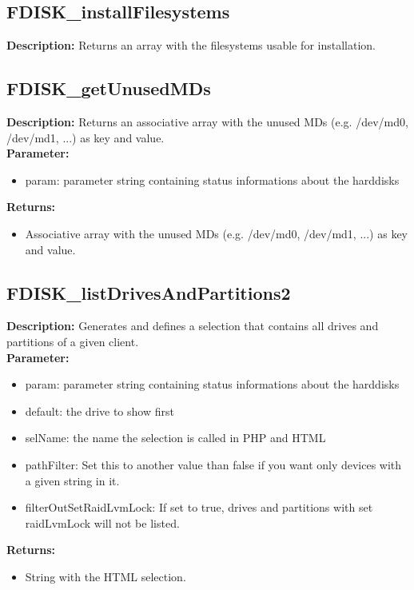 \subsection{FDISK\_installFilesystems}
\textbf{Description:} Returns an array with the filesystems usable for installation.\\

\subsection{FDISK\_getUnusedMDs}
\textbf{Description:} Returns an associative array with the unused MDs (e.g. /dev/md0, /dev/md1, ...) as key and value.\\
\textbf{Parameter:}
\begin{itemize}
\item param: parameter string containing status informations about the harddisks
\end{itemize}
\textbf{Returns:}
\begin{itemize}
\item Associative array with the unused MDs (e.g. /dev/md0, /dev/md1, ...) as key and value.
\end{itemize}

\subsection{FDISK\_listDrivesAndPartitions2}
\textbf{Description:} Generates and defines a selection that contains all drives and partitions of a given client.\\
\textbf{Parameter:}
\begin{itemize}
\item param: parameter string containing status informations about the harddisks
\item default: the drive to show first
\item selName: the name the selection is called in PHP and HTML
\item pathFilter: Set this to another value than false if you want only devices with a given string in it.
\item filterOutSetRaidLvmLock: If set to true, drives and partitions with set raidLvmLock will not be listed.
\end{itemize}
\textbf{Returns:}
\begin{itemize}
\item String with the HTML selection.
\end{itemize}

